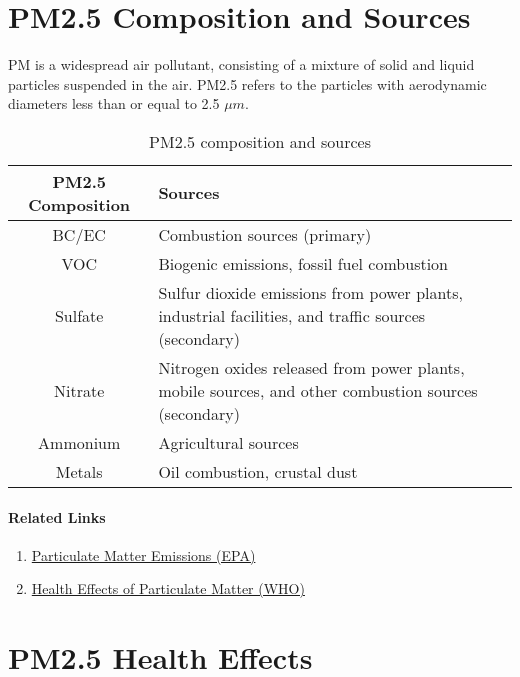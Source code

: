 \documentclass{article}
\begin{document}
\section{PM2.5 Composition and Sources}

PM is a widespread air pollutant, consisting of a mixture of solid and liquid particles suspended in the air. PM2.5 refers to the particles with aerodynamic diameters less than or equal to 2.5 $\mu m$.

\begin{table}[h!]
    \centering
    \begin{tabular}{|c|p{}|}
        \hline
        \textbf{PM2.5 Composition} & \textbf{Sources}  \\
        \hline
        BC/EC & Combustion sources (primary) \\
        \hline
        VOC & Biogenic emissions, fossil fuel combustion \\
        \hline
        Sulfate &  Sulfur dioxide emissions from power plants, industrial facilities, and traffic sources (secondary) \\
        \hline
        Nitrate & Nitrogen oxides released from power plants, mobile sources, and other combustion sources (secondary) \\
        \hline
        Ammonium & Agricultural sources \\
        \hline 
        Metals &  Oil combustion, crustal dust \\
        \hline
    \end{tabular}
    \caption{PM2.5 composition and sources}
    \label{tab:com}
\end{table}

\paragraph{Related Links}

\begin{enumerate}
    \item \href{https://cfpub.epa.gov/roe/indicator_pdf.cfm?i=19}{Particulate Matter Emissions (EPA)}
     \item \href{http://www.euro.who.int/__data/assets/pdf_file/0006/189051/Health-effects-of-particulate-matter-final-Eng.pdf}{Health Effects of Particulate Matter (WHO)}
\end{enumerate}

\section{PM2.5 Health Effects}
\end{document}

